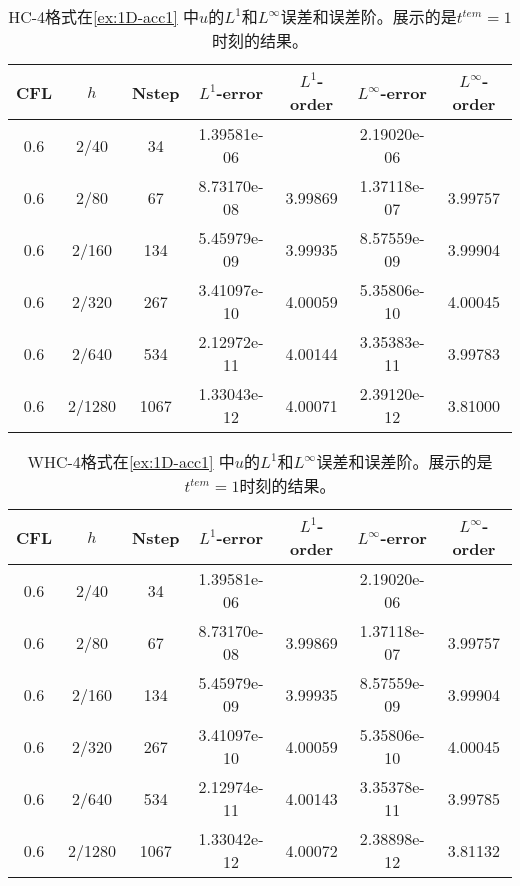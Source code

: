 \def\titleintable{CFL&$h$&Nstep&$L^1$-error&$L^1$-order&$L^\infty$-error&$L^\infty$-order\\}
\begin{table}[htbp]
	\caption{HC-4格式在\cref{ex:1D-acc1} 中$u$的$L^1$和$L^\infty$误差和误差阶。展示的是$t^{tem} = 1$时刻的结果。}
	\label{ta:1D-ex1-HC4}
	\centering
	\begin{tabular}{ccccccc}
		\toprule
		\titleintable
		\midrule
		0.6 & 2/40   & 34   & 1.39581e-06 &         & 2.19020e-06 &         \\
		0.6 & 2/80   & 67   & 8.73170e-08 & 3.99869 & 1.37118e-07 & 3.99757 \\
		0.6 & 2/160  & 134  & 5.45979e-09 & 3.99935 & 8.57559e-09 & 3.99904 \\
		0.6 & 2/320  & 267  & 3.41097e-10 & 4.00059 & 5.35806e-10 & 4.00045 \\
		0.6 & 2/640  & 534  & 2.12972e-11 & 4.00144 & 3.35383e-11 & 3.99783 \\
		0.6 & 2/1280 & 1067 & 1.33043e-12 & 4.00071 & 2.39120e-12 & 3.81000 \\
		\bottomrule
	\end{tabular}
\end{table}

\begin{table}[htbp]
	\caption{WHC-4格式在\cref{ex:1D-acc1} 中$u$的$L^1$和$L^\infty$误差和误差阶。展示的是$t^{tem} = 1$时刻的结果。}
	\label{ta:1D-ex1-WHC4}
	\centering
	\begin{tabular}{ccccccc}
		\toprule
		\titleintable
		\midrule
		0.6 & 2/40   & 34   & 1.39581e-06 &         & 2.19020e-06 &         \\
		0.6 & 2/80   & 67   & 8.73170e-08 & 3.99869 & 1.37118e-07 & 3.99757 \\
		0.6 & 2/160  & 134  & 5.45979e-09 & 3.99935 & 8.57559e-09 & 3.99904 \\
		0.6 & 2/320  & 267  & 3.41097e-10 & 4.00059 & 5.35806e-10 & 4.00045 \\
		0.6 & 2/640  & 534  & 2.12974e-11 & 4.00143 & 3.35378e-11 & 3.99785 \\
		0.6 & 2/1280 & 1067 & 1.33042e-12 & 4.00072 & 2.38898e-12 & 3.81132 \\
		\bottomrule
	\end{tabular}
\end{table}

